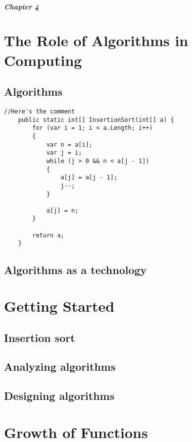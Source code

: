 \documentclass[letterpaper]{book}
\begin{document}
	\paragraph{Chapter 4} 
	\Blindtext	

	\chapter{The Role of Algorithms in Computing}
	\section{Algorithms}

	\begin{lstlisting}[language={[Sharp]C}, caption={Insertion Sort}, label={Script}]
	//Here's the comment
	public static int[] InsertionSort(int[] a) {
		for (var i = 1; i < a.Length; i++)
		{
			var n = a[i];
			var j = i;
			while (j > 0 && n < a[j - 1])
			{
				a[j] = a[j - 1];
				j--;
			}

			a[j] = n;
		}

		return a;
	}
	\end{lstlisting}

	\Blindtext
	\newpage

	\section{Algorithms as a technology}
	\Blindtext
	\newpage

	\chapter{Getting Started}
	\section{Insertion sort}
	\Blindtext
	\newpage

	\section{Analyzing algorithms}
	\Blindtext
	\newpage

	\section{Designing algorithms}
	\Blindtext
	\newpage

	\chapter{Growth of Functions}
\end{document}
